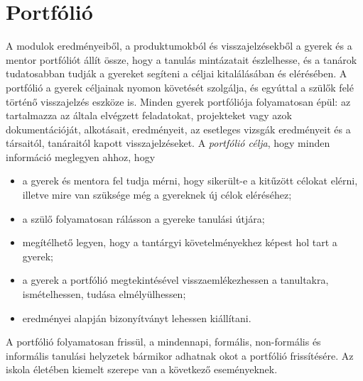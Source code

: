\section{Portfólió}
\label{sec:portfolio}
A modulok eredményeiből, a produktumokból és visszajelzésekből a gyerek és a
mentor portfóliót
állít össze, hogy a tanulás mintázatait észlelhesse, és a
tanárok tudatosabban tudják
a gyereket segíteni a céljai kitalálásában és elérésében. A portfólió a gyerek
céljainak nyomon követését szolgálja, és egyúttal a szülők felé történő
visszajelzés eszköze
is. Minden gyerek portfóliója folyamatosan épül: az tartalmazza az általa
elvégzett feladatokat, projekteket vagy azok dokumentációját, alkotásait,
eredményeit, az esetleges vizsgák eredményeit és a társaitól, tanáraitól kapott
visszajelzéseket. A \emph{portfólió célja}, hogy minden információ meglegyen
ahhoz,
hogy

\begin{itemize}
      \item a gyerek és mentora fel tudja mérni, hogy sikerült-e a kitűzött
            célokat
            elérni, illetve mire van szüksége még a gyereknek új célok
            eléréséhez;

      \item a szülő folyamatosan rálásson a gyereke tanulási útjára;

      \item megítélhető legyen, hogy a tantárgyi követelményekhez
            képest
            hol
            tart a gyerek;

      \item a gyerek a portfólió megtekintésével visszaemlékezhessen a
            tanultakra,
            ismételhessen, tudása elmélyülhessen;

      \item eredményei alapján bizonyítványt lehessen kiállítani.

\end{itemize}

A portfólió folyamatosan frissül, a mindennapi, formális, non-formális és
informális tanulási helyzetek
bármikor adhatnak okot a portfólió frissítésére. Az iskola életében kiemelt
szerepe van a következő eseményeknek.

